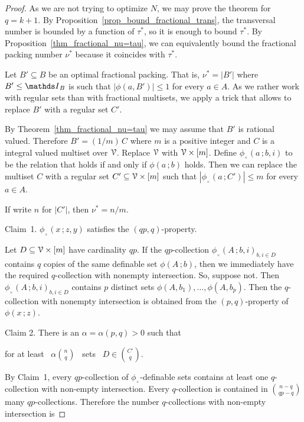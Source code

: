 \documentclass[scombinatorics.tex]{subfiles}
\begin{document}
\begin{proof}
As we are not trying to optimize $N$, we may prove the theorem for $q=k+1$.
By Proposition~\ref{prop_bound_fractional_trans}, the transversal number is bounded by a function of $\tau^*$, so it is enough to bound $\tau^*$. By Proposition~\ref{thm_fractional_nu=tau}, we can equivalently bound the fractional packing number $\nu^*$ because it coincides with $\tau^*$.

Let $B'\subseteq B$ be an optimal fractional packing.  That is, $\nu^*=|B'|$ where $B'\le\Indicator_B$ is such that $|\phi(a,B')|\le1$ for every $a\in A$. As we rather work with regular sets than with fractional multisets, we apply a trick that allows to replace $B'$ with a regular set $C'$. 

By Theorem~\ref{thm_fractional_nu=tau} we may assume that $B'$ is rational valued. Therefore $B'=(1/m)\,C$ where $m$ is a positive integer and $C$ is a integral valued multiset over $\EuScript V$.
Replace $\EuScript V$ with $\EuScript V\times[m]$.
Define $\phi\!_{_\times}\!(a\,;b,i)$ to be the relation that holds if and only if $\phi(a\,;b)$ holds.
Then we can replace the multiset $C$ with a regular set $C'\subseteq\EuScript V\times[m]$ such that $|\phi\!_{_\times}\!(a\,;C')|\le m$ for every $a\in A$.

If write $n$ for $|C'|$, then $\nu^*=n/m$.

\smallskip
Claim~1. $\phi\!_{_\times}\!(x\,;z,y)$ satisfies the $(qp,q)$-property.

Let $D\subseteq\EuScript V\times[m]$ have cardinality $qp$. 
If the $qp$-collection $\phi\!_{_\times}\!(A\,;b,i)_{b,i\in D}$ contains $q$ copies of the same definable set $\phi(A\,;b)$, then we immediately have the required $q$-collection with nonempty intersection.
So, suppose not.
Then  $\phi\!_{_\times}\!(A\,;b,i)_{b,i\in D}$ contains $p$ distinct sets $\phi(A,b_1),\dots,\phi(A,b_p)$. 
Then the $q$-collection with nonempty intersection is obtained from the $(p,q)$-property of $\phi(x\,;z)$.

\smallskip
Claim 2.
There is an $\alpha=\alpha(p,q)>0$ such that

\hfill for at least \ $\displaystyle\alpha{n\choose q}$ \ sets \ $\displaystyle D\in{C'\choose q}$.

By Claim~1, every $qp$-collection of $\phi\!_{_\times}\!$-definable sets contains at least one $q$-collection with non-empty intersection.
Every $q$-collection is contained in ${n-q\choose qp-q}$ many $qp$-collections.
Therefore the number $q$-collections with non-empty intersection is


\end{proof}
\end{document}
